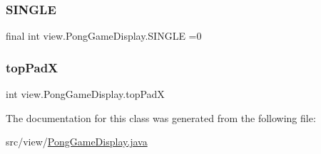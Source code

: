 \subsubsection{\texorpdfstring{S\+I\+N\+G\+LE}{SINGLE}}
{\footnotesize\ttfamily final int view.\+Pong\+Game\+Display.\+S\+I\+N\+G\+LE =0\hspace{0.3cm}{\ttfamily [private]}}

\hypertarget{classview_1_1_pong_game_display_a808ad12c167de880ca74e5ad56ea5f43}{}\label{classview_1_1_pong_game_display_a808ad12c167de880ca74e5ad56ea5f43} 
\subsubsection{\texorpdfstring{top\+PadX}{topPadX}}
{\footnotesize\ttfamily int view.\+Pong\+Game\+Display.\+top\+PadX\hspace{0.3cm}{\ttfamily [private]}}



The documentation for this class was generated from the following file\+:\begin{DoxyCompactItemize}
\item 
src/view/\hyperlink{_pong_game_display_8java}{Pong\+Game\+Display.\+java}\end{DoxyCompactItemize}
